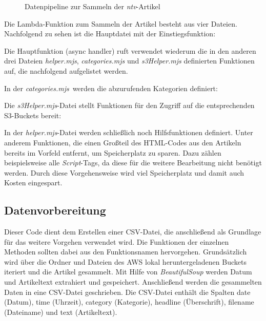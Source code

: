 \documentclass[12pt]{article}
\begin{document}
\begin{sloppypar}
	\begin{figure}[h]
		\centering
		
		\caption{Datenpipeline zur Sammeln der \emph{ntv}-Artikel}
		\label{fig:datenpipeline}
	\end{figure}

	Die Lambda-Funktion zum Sammeln der Artikel besteht aus vier Dateien.
	Nachfolgend zu sehen ist die Hauptdatei mit der Einstiegsfunktion:

	

	Die Hauptfunktion (async handler) ruft verwendet wiederum die in den anderen
	drei Dateien \emph{helper.mjs}, \emph{categories.mjs} und
	\emph{s3Helper.mjs} definierten Funktionen auf, die nachfolgend aufgelistet
	werden.

	In der \emph{categories.mjs} werden die abzurufenden Kategorien definiert:

	

	Die \emph{s3Helper.mjs}-Datei stellt Funktionen für den Zugriff auf die
	entsprechenden S3-Buckets bereit:

	

	In der \emph{helper.mjs}-Datei werden schließlich noch Hilfsfunktionen
	definiert. Unter anderem Funktionen, die einen Großteil des HTML-Codes aus
	den Artikeln bereits im Vorfeld entfernt, um Speicherplatz zu sparen. Dazu
	zählen beispielsweise alle \emph{Script}-Tags, da diese für die weitere
	Bearbeitung nicht benötigt werden. Durch diese Vorgehensweise wird viel
	Speicherplatz und damit auch Kosten eingespart.

	

	\subsection{Datenvorbereitung}

	Dieser Code dient dem Erstellen einer CSV-Datei, die anschließend als
	Grundlage für das weitere Vorgehen verwendet wird. Die Funktionen der
	einzelnen Methoden sollten dabei aus den Funktionsnamen hervorgehen.
	Grundsätzlich wird über die Ordner und Dateien des AWS lokal
	heruntergeladenen Buckets iteriert und die Artikel gesammelt. Mit Hilfe von
	\emph{BeautifulSoup} werden Datum und Artikeltext extrahiert und
	gespeichert. Anschließend werden die gesammelten Daten in eine CSV-Datei
	geschrieben. Die CSV-Datei enthält die Spalten date (Datum), time (Uhrzeit),
	category (Kategorie), headline (Überschrift), filename (Dateiname) und text
	(Artikeltext).


\end{sloppypar}
\end{document}
